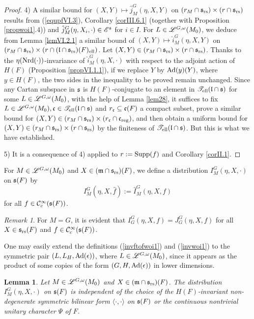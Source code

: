 \documentclass[a4paper]{amsart}
\newcommand{\mse}{\mathscr{E}}\newcommand{\msf}{\mathscr{F}}\newcommand{\msg}{\mathscr{G}}\newcommand{\msh}{\mathscr{H}}
\newcommand{\fm}{{\mathfrak{m}}} \newcommand{\fn}{{\mathfrak{n}}}\newcommand{\fo}{{\mathfrak{o}}} \newcommand{\fp}{{\mathfrak{p}}}
\newtheorem{lem}[thm]{Lemma}
\theoremstyle{definition}
\theoremstyle{remark}
\newtheorem{remark}[thm]{Remark}
\numberwithin{equation}{subsection}
\begin{document}
\begin{proof}
4) A similar bound for $(X,Y)\mapsto\hat{j}_M^G(\eta,X,Y)$ on $(r_M\cap{\mathfrak{s}}_{\mathrm{rs}})\times(r\cap{\mathfrak{s}}_{\mathrm{rs}})$ results from (\ref{equpfVI.3}), Corollary \ref{corIII.6.1} (together with Proposition \ref{propwoi1}.4)) and $\hat{j}_M^G(\eta, X_i, \cdot)\in\mse^\fs$ for $i\in I$. For $L\in\mathscr{L}^{G,\omega}(M_0)$, we deduce from Lemma \ref{lemVI.2.1} a similar bound of $(X, Y)\mapsto\hat{i}_M^G(\eta, X, Y)$ on $(r_M\cap{\mathfrak{s}}_{\mathrm{rs}})\times(r\cap({\mathfrak{l}}\cap{\mathfrak{s}}_{\mathrm{rs}})(F)_{\mathrm{ell}})$. Let $(X,Y)\in(r_M\cap{\mathfrak{s}}_{\mathrm{rs}})\times(r\cap{\mathfrak{s}}_{\mathrm{rs}})$. Thanks to the $\eta({\mathrm{Nrd}}(\cdot))$-invariance of $\hat{i}_M^G(\eta, X, \cdot)$ with respect to the adjoint action of $H(F)$ (Proposition \ref{propVI.1.1}), if we replace $Y$ by ${\mathrm{Ad}}(y)(Y)$, where $y\in H(F)$, the two sides in the inequality to be proved remain unchanged. Since any Cartan subspace in ${\mathfrak{s}}$ is $H(F)$-conjugate to an element in $\mathscr{T}_{\mathrm{ell}}({\mathfrak{l}}\cap{\mathfrak{s}})$ for some $L\in\mathscr{L}^{G,\omega}(M_0)$, with the help of Lemma \ref{lem28}, it suffices to fix $L\in\mathscr{L}^{G,\omega}(M_0), {\mathfrak{c}}\in\mathscr{T}_{\mathrm{ell}}({\mathfrak{l}}\cap{\mathfrak{s}})$ and $r_{\mathfrak{c}}\subseteq{\mathfrak{c}}(F)$ a compact subset, prove a similar bound for $(X,Y)\in(r_M\cap{\mathfrak{s}}_{\mathrm{rs}})\times(r_{\mathfrak{c}}\cap{\mathfrak{c}}_{\mathrm{reg}})$, and then obtain a uniform bound for $(X,Y)\in(r_M\cap{\mathfrak{s}}_{\mathrm{rs}})\times(r\cap{\mathfrak{s}}_{\mathrm{rs}})$ by the finiteness of $\mathscr{T}_{\mathrm{ell}}({\mathfrak{l}}\cap{\mathfrak{s}})$. But this is what we have established. 

5) It is a consequence of 4) applied to $r:={\mathrm{Supp}}(f)$ and Corollary \ref{corII.1}. 
\end{proof}

For $M\in\mathscr{L}^{G, \omega}(M_0)$ and $X\in(\fm\cap\fs_\rs)(F)$, we define a distribution $I_M^G(\eta, X, \cdot)$ on ${\mathfrak{s}}(F)$ by
\begin{equation}\label{invwoi1}
 I_M^G(\eta, X, \hat{f}):=\hat{I}_M^G(\eta, X, f) 
\end{equation}
for all $f\in{\mathcal {C}}_c^\infty({\mathfrak{s}}(F))$. 

\begin{remark}
For $M=G$, it is evident that $I_G^G(\eta, X, f)=J_G^G(\eta, X, f)$ for all $X\in{\mathfrak{s}}_{\mathrm{rs}}(F)$ and $f\in{\mathcal {C}}_c^\infty({\mathfrak{s}}(F))$. 
\end{remark}

One may easily extend the definitions (\ref{invftofwoi1}) and (\ref{invwoi1}) to the symmetric pair $(L, L_H, {\mathrm{Ad}}(\epsilon))$, where $L\in\mathscr{L}^{G,\omega}(M_0)$, since it appears as the product of some copies of the form $(G, H, {\mathrm{Ad}}(\epsilon))$ in lower dimensions. 

\begin{lem}\label{lemVI.5.1}
Let $M\in\mathscr{L}^{G, \omega}(M_0)$ and $X\in(\fm\cap\fs_\rs)(F)$. The distribution $I_M^G(\eta, X, \cdot)$ on ${\mathfrak{s}}(F)$ is independent of the choice of the $H(F)$-invariant non-degenerate symmetric bilinear form $\langle\cdot, \cdot\rangle$ on ${\mathfrak{s}}(F)$ or the continuous nontrivial unitary character $\Psi$ of $F$. 
\end{lem}
\end{document}
